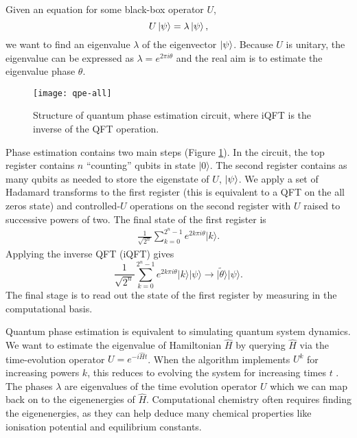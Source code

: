 \documentclass[10pt]{iopart}
\begin{document}
Given an equation for some black-box operator $U$,
\begin{equation}
U \ket{\psi} = \lambda \ket{\psi},
\end{equation}
we want to find an eigenvalue $\lambda$ of the eigenvector $\ket{\psi}$. Because $U$ is unitary, the eigenvalue can be expressed as $\lambda = e^{2\pi i \theta}$ and the real aim is to estimate the eigenvalue phase $\theta$.

\begin{figure}[ht!]
\centering
\texttt{[image: qpe-all]}
\caption{Structure of quantum phase estimation circuit, where iQFT is the inverse of the QFT operation.}
\label{fig:qpe}
\end{figure}

Phase estimation contains two main steps (Figure \ref{fig:qpe}). In the circuit, the top register contains $n$ ``counting'' qubits in state $\vert 0 \rangle$. The second register contains as many qubits as needed to store the eigenstate of $U$, $\ket{\psi}$. We apply a set of Hadamard transforms to the first register (this is equivalent to a QFT on the all zeros state) and controlled-$U$ operations on the second register with $U$ raised to successive powers of two. The final state of the first register is 
\begin{align}
\frac{1}{\sqrt{2^n}} \sum_{k=0}^{2^n-1}e^{2k\pi i\theta} \vert k \rangle.
\end{align}
Applying the inverse QFT (iQFT) gives
\begin{equation}
\frac{1}{\sqrt{2^n}} \sum_{k=0}^{2^n-1}e^{2k\pi i\theta} \vert k \rangle \vert \psi \rangle \to \vert\tilde{\theta}\rangle \vert \psi \rangle.
\end{equation}
The final stage is to read out the state of the first register by measuring in the computational basis. 

Quantum phase estimation is equivalent to simulating quantum system dynamics. We want to estimate the eigenvalue of Hamiltonian $\hat{H}$ by querying $\hat{H}$ via the time-evolution operator $U=e^{-i\hat{H}t}$. When the algorithm implements $U^k$ for increasing powers $k$, this reduces to evolving the system for increasing times $t$ \cite{AspuruGuzik2005}. The phases $\lambda$ are eigenvalues of the time evolution operator $U$ which we can map back on to the eigenenergies of $\hat{H}$. Computational chemistry often requires finding the eigenenergies, as they can help deduce many chemical properties like ionisation potential and equilibrium constants.
\end{document}
